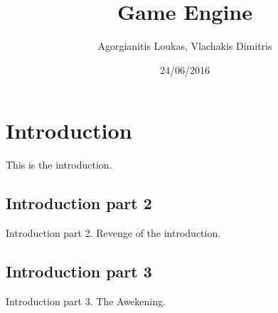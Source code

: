 \documentclass[10 pt]{article}
\title{Game Engine}
\date{24/06/2016}
\author{Agorgianitis Loukas, Vlachakis Dimitris}
\begin{document}
\maketitle
\newpage
\tableofcontents
\newpage
{}

\section{Introduction}
This is the introduction.

\subsection{Introduction part 2}
Introduction part 2. Revenge of the introduction.

\subsection{Introduction part 3}
Introduction part 3. The Awekening.

\newpage
\raggedright{}
\nocite{*}



\end{document}

